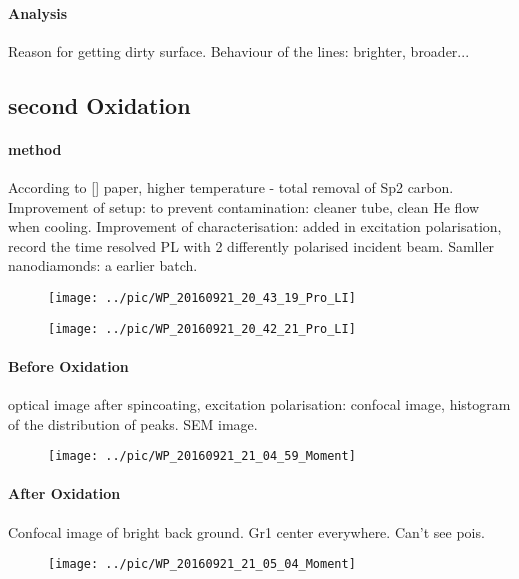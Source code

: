 \paragraph{Analysis} Reason for getting dirty surface. Behaviour of the lines: brighter, broader...

\subsection[Second Oxidation]{second Oxidation}

\paragraph{method} According to [] paper, higher temperature - total removal of Sp2 carbon. Improvement of setup: to prevent contamination: cleaner tube, clean He flow when cooling. Improvement of characterisation: added in excitation polarisation, record the time resolved PL with 2 differently polarised incident beam. Samller nanodiamonds: a earlier batch.
\begin{figure}[h]
\centering
\texttt{[image: ../pic/WP\_20160921\_20\_43\_19\_Pro\_LI]}
\caption{}
\label{fig:wp20160921204319proli}
\end{figure}
\begin{figure}[h]
\centering
\texttt{[image: ../pic/WP\_20160921\_20\_42\_21\_Pro\_LI]}
\caption{}
\label{fig:wp20160921204221proli}
\end{figure}

\paragraph{Before Oxidation} optical image after spincoating, excitation polarisation: confocal image, histogram of the distribution of peaks. SEM image.
\begin{figure}[h]
	\centering
	\texttt{[image: ../pic/WP\_20160921\_21\_04\_59\_Moment]}
	\caption{}
	\label{fig:wp20160921210459moment}
\end{figure}

\paragraph{After Oxidation} Confocal image of bright back ground. Gr1 center everywhere. Can't see pois.
\begin{figure}[h]
\centering
\texttt{[image: ../pic/WP\_20160921\_21\_05\_04\_Moment]}
\caption{}
\label{fig:wp20160921210504moment}
\end{figure}


